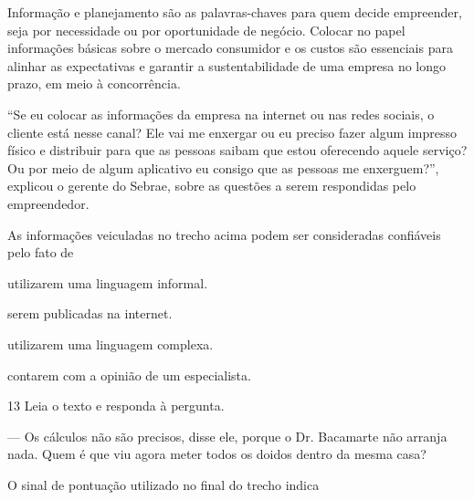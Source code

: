 \begin{myquote}
\begin{myescolha}
\begin{myquote}
Informação e planejamento são as palavras-chaves para quem decide
empreender, seja por necessidade ou por oportunidade de negócio. Colocar
no papel informações básicas sobre o mercado consumidor e os custos são
essenciais para alinhar as expectativas e garantir a sustentabilidade de
uma empresa no longo prazo, em meio à concorrência.

``Se eu colocar as informações da empresa na internet ou nas redes
sociais, o cliente está nesse canal? Ele vai me enxergar ou eu preciso
fazer algum impresso físico e distribuir para que as pessoas saibam que
estou oferecendo aquele serviço? Ou por meio de algum aplicativo eu
consigo que as pessoas me enxerguem?'', explicou o gerente do Sebrae,
sobre as questões a serem respondidas pelo empreendedor.

\end{myquote}

As informações veiculadas no trecho acima podem ser consideradas
confiáveis pelo fato de

\begin{escolha}
  \item utilizarem uma linguagem informal.

  \item serem publicadas na internet.

  \item utilizarem uma linguagem complexa.

  \item contarem com a opinião de um especialista.
\end{escolha}

\num{13} Leia o texto e responda à pergunta.

\begin{myquote}
--- Os cálculos não são precisos, disse ele, porque o Dr. Bacamarte não
arranja nada. Quem é que viu agora meter todos os doidos dentro da mesma
casa?

\end{myquote}

O sinal de pontuação utilizado no final do trecho indica


\end{myescolha}
\end{myquote}
